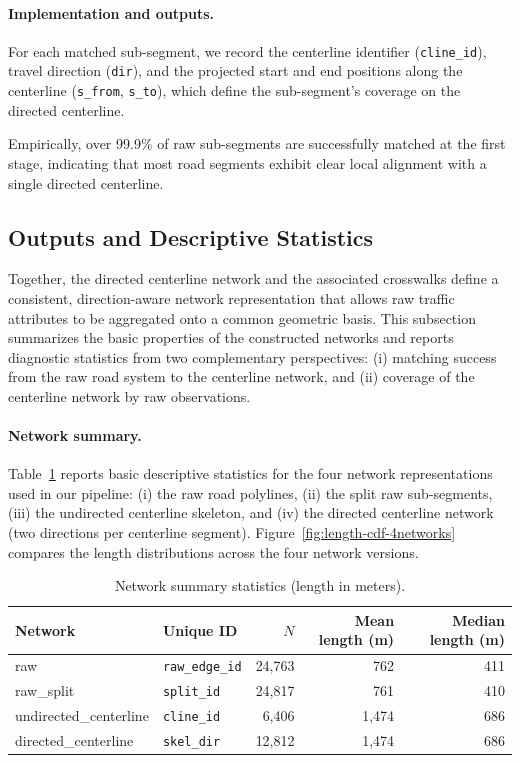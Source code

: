 \documentclass[12pt]{article}
\begin{document}
	\paragraph{Implementation and outputs.}
	For each matched sub-segment, we record the centerline identifier (\texttt{cline\_id}), travel direction (\texttt{dir}), and the projected start and end positions along the centerline (\texttt{s\_from}, \texttt{s\_to}), which define the sub-segment’s coverage on the directed centerline.
	
	Empirically, over 99.9\% of raw sub-segments are successfully matched at the first stage, indicating that most road segments exhibit clear local alignment with a single directed centerline.
	

	\subsection{Outputs and Descriptive Statistics}
	
	Together, the directed centerline network and the associated crosswalks define a consistent, direction-aware network representation that allows raw traffic attributes to be aggregated onto a common geometric basis. This subsection summarizes the basic properties of the constructed networks and reports diagnostic statistics from two complementary perspectives: (i) matching success from the raw road system to the centerline network, and (ii) coverage of the centerline network by raw observations.
	
	\paragraph{Network summary.}
	Table~\ref{tab:network-summary} reports basic descriptive statistics for the four network representations used in our pipeline: (i) the raw road polylines, (ii) the split raw sub-segments, (iii) the undirected centerline skeleton, and (iv) the directed centerline network (two directions per centerline segment). 	Figure~\ref{fig:length-cdf-4networks} compares the length distributions across the four
	network versions. 
	
	\begin{table}[h!]
		\centering
		\caption{Network summary statistics (length in meters).}
		\label{tab:network-summary}
		\begin{tabular}{l l r r r}
			\toprule
			Network & Unique ID & $N$ & Mean length (m) & Median length (m) \\
			\midrule
			raw & \texttt{raw\_edge\_id} & 24,763 & 762 & 411 \\
			raw\_split & \texttt{split\_id} & 24,817 & 761 & 410 \\
			undirected\_centerline & \texttt{cline\_id} & 6,406 & 1,474 & 686 \\
			directed\_centerline & \texttt{skel\_dir} & 12,812 & 1,474 & 686 \\
			\bottomrule
		\end{tabular}
	\end{table}
	
\end{document}
